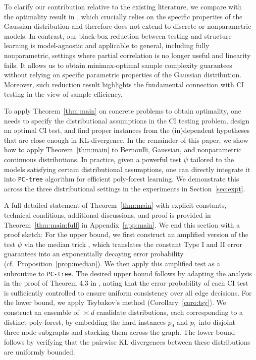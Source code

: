\documentclass{article}
\theoremstyle{definition}
\theoremstyle{definition}
\theoremstyle{definition}
\theoremstyle{definition}
\theoremstyle{definition}
\theoremstyle{definition}
\theoremstyle{remark}
\theoremstyle{remark}
\begin{document}
To clarify our contribution relative to the existing literature, we compare with the optimality result in \citet{wang2024optimal}, which crucially relies on the specific properties of the Gaussian distribution and therefore does not extend to discrete or nonparametric models.
In contrast, our black-box reduction between testing and structure learning is model-agnostic and applicable to general, including fully nonparametric, settings where partial correlation is no longer useful and linearity fails. It allows us to obtain minimax-optimal sample complexity guarantees without relying on specific parametric properties of the Gaussian distribution. Moreover, such reduction result highlights the fundamental connection with CI testing in the view of sample efficiency.

To apply Theorem~\ref{thm:main} on concrete problems to obtain optimality, one needs to specify the distributional assumptions in the CI testing problem, design an optimal CI test, and find proper instances from the (in)dependent hypotheses that are close enough in KL-divergence.
In the remainder of this paper, we show how to apply Theorem~\ref{thm:main} to Bernoulli, Gaussian, and nonparametric continuous distributions.
In practice, given a powerful test $\psi$ tailored to the models satisfying certain distributional assumptions, one can directly integrate it into \texttt{PC-tree} algorithm for efficient poly-forest learning. 
We demonstrate this across the three distributional settings in the experiments in Section~\ref{sec:expt}.


A full detailed statement of Theorem~\ref{thm:main} with explicit constants, technical conditions, additional discussions, and proof is provided in Theorem~\ref{thm:main:full} in Appendix~\ref{app:main}.
We end this section with a proof sketch: For the upper bound, we first construct an amplified version of the test $\psi$ via the median trick \citep{motwani1995randomized}, which translates the constant Type I and II error guarantees into an exponentially decaying error probability (cf.~Proposition~\ref{prop:median}). We then apply this amplified test as a subroutine to \texttt{PC-tree}. The desired upper bound follows by adapting the analysis in the proof of Theorem 4.3 in \citet{wang2024optimal}, noting that the error probability of each CI test is sufficiently controlled to ensure uniform consistency over all edge decisions.
For the lower bound, we apply Tsybakov’s method (Corollary~\ref{coro:tsy}). We construct an ensemble of $\asymp d$ candidate distributions, each corresponding to a distinct poly-forest, by embedding the hard instances $p_0$ and $p_1$ into disjoint three-node subgraphs and stacking them across the graph. The lower bound follows by verifying that the pairwise KL divergences between these distributions are uniformly bounded.
\end{document}
